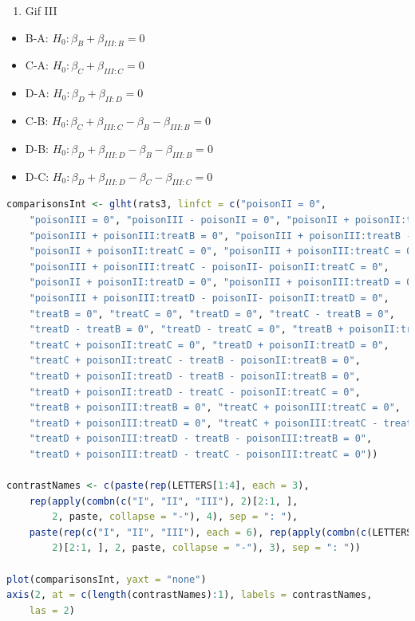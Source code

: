 \documentclass[
  12pt,dutch,coursenotes]{book}
\providecommand{\tightlist}{%
  \setlength{\itemsep}{0pt}\setlength{\parskip}{0pt}}
\theoremstyle{definition}
\theoremstyle{definition}
\theoremstyle{definition}
\theoremstyle{definition}
\theoremstyle{remark}
\begin{document}
\begin{enumerate}
\def\labelenumi{\arabic{enumi}.}
\setcounter{enumi}{2}
\tightlist
\item
  Gif III
\end{enumerate}

\begin{itemize}
\tightlist
\item
  B-A: \(H_0: \beta_{B}+\beta_{III:B}=0\)
\item
  C-A: \(H_0: \beta_{C}+\beta_{III:C}=0\)
\item
  D-A: \(H_0: \beta_{D}+\beta_{II:D}=0\)
\item
  C-B: \(H_0: \beta_{C}+\beta_{III:C}-\beta_{B}-\beta_{III:B}=0\)
\item
  D-B: \(H_0: \beta_{D}+\beta_{III:D}-\beta_{B}-\beta_{III:B}=0\)
\item
  D-C: \(H_0: \beta_{D}+\beta_{III:D}-\beta_{C}-\beta_{III:C}=0\)
\end{itemize}

\begin{lstlisting}[language=R]
comparisonsInt <- glht(rats3, linfct = c("poisonII = 0",
    "poisonIII = 0", "poisonIII - poisonII = 0", "poisonII + poisonII:treatB = 0",
    "poisonIII + poisonIII:treatB = 0", "poisonIII + poisonIII:treatB - poisonII- poisonII:treatB = 0",
    "poisonII + poisonII:treatC = 0", "poisonIII + poisonIII:treatC = 0",
    "poisonIII + poisonIII:treatC - poisonII- poisonII:treatC = 0",
    "poisonII + poisonII:treatD = 0", "poisonIII + poisonIII:treatD = 0",
    "poisonIII + poisonIII:treatD - poisonII- poisonII:treatD = 0",
    "treatB = 0", "treatC = 0", "treatD = 0", "treatC - treatB = 0",
    "treatD - treatB = 0", "treatD - treatC = 0", "treatB + poisonII:treatB = 0",
    "treatC + poisonII:treatC = 0", "treatD + poisonII:treatD = 0",
    "treatC + poisonII:treatC - treatB - poisonII:treatB = 0",
    "treatD + poisonII:treatD - treatB - poisonII:treatB = 0",
    "treatD + poisonII:treatD - treatC - poisonII:treatC = 0",
    "treatB + poisonIII:treatB = 0", "treatC + poisonIII:treatC = 0",
    "treatD + poisonIII:treatD = 0", "treatC + poisonIII:treatC - treatB - poisonIII:treatB = 0",
    "treatD + poisonIII:treatD - treatB - poisonIII:treatB = 0",
    "treatD + poisonIII:treatD - treatC - poisonIII:treatC = 0"))

contrastNames <- c(paste(rep(LETTERS[1:4], each = 3),
    rep(apply(combn(c("I", "II", "III"), 2)[2:1, ],
        2, paste, collapse = "-"), 4), sep = ": "),
    paste(rep(c("I", "II", "III"), each = 6), rep(apply(combn(c(LETTERS[1:4]),
        2)[2:1, ], 2, paste, collapse = "-"), 3), sep = ": "))

plot(comparisonsInt, yaxt = "none")
axis(2, at = c(length(contrastNames):1), labels = contrastNames,
    las = 2)
\end{lstlisting}
\end{document}
